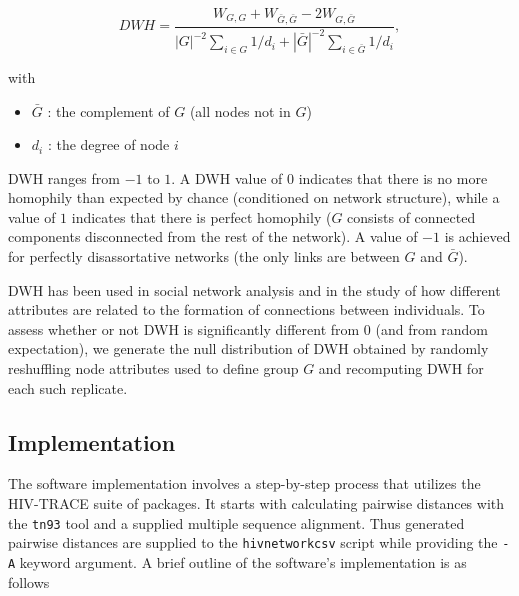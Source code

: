 \documentclass[utf8]{FrontiersinHarvard} %
\begin{document}
\begin{equation}
	DWH = \frac{W_{G,G}+ W_{\bar G, \bar G} - 2W_{G,\bar G}}{|G|^{-2}\sum_{i\in G} 1 / d_i + |\bar G|^{-2}\sum_{i\in \bar G} 1 / d_i },
\end{equation}

with
\begin{itemize}
	\item{$\bar G$ : the complement of $G$ (all nodes not in $G$)}
	\item{$d_i$ : the degree of node $i$}
\end{itemize}

DWH ranges from $-1$ to $1$. A DWH value of $0$ indicates that there is no more
homophily than expected by chance (conditioned on network structure), while a
value of $1$ indicates that there is perfect homophily ($G$ consists of
connected components disconnected from the rest of the network). A value of
$-1$ is achieved for perfectly disassortative networks (the only links are
between $G$ and $\bar G$).

DWH has been used in social network analysis and in the study of how different
attributes are related to the formation of connections between individuals. To
assess whether or not DWH is significantly different from $0$ (and from random
expectation), we generate the null distribution of DWH obtained by randomly
reshuffling node attributes used to define group $G$ and recomputing DWH for
each such replicate.

\subsection{Implementation}

The software implementation involves a step-by-step process that utilizes the
HIV-TRACE suite of packages. It starts with calculating pairwise distances with
the {\tt tn93} tool and a supplied multiple sequence alignment. Thus generated
pairwise distances are supplied to the {\tt hivnetworkcsv} script while
providing the {\tt -A} keyword argument. A brief outline of the software's
implementation is as follows
\end{document}

